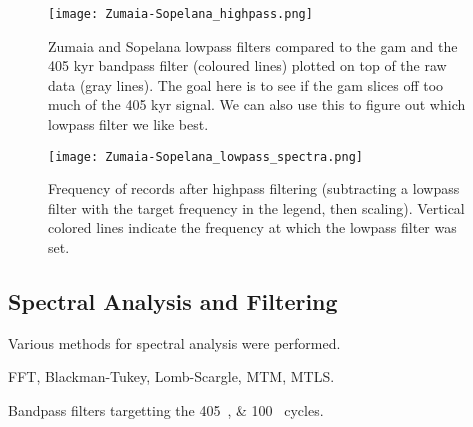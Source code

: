 \documentclass[draft]{agujournal2019}
\begin{document}
\begin{figure}[htbp]
  \centering
  \texttt{[image: Zumaia-Sopelana\_highpass.png]}
  \caption{\label{fig:highpass}Zumaia and Sopelana lowpass filters compared to
    the gam and the 405 kyr bandpass filter (coloured lines) plotted on top of
    the raw data (gray lines). The goal here is to see if the gam slices off
    too much of the 405 kyr signal. We can also use this to figure out which
    lowpass filter we like best.
  }
\end{figure}

\begin{figure}[htbp]
  \centering
  \texttt{[image: Zumaia-Sopelana\_lowpass\_spectra.png]}
  \caption{\label{fig:highpass-spec}Frequency of records after highpass
    filtering (subtracting a lowpass filter with the target frequency in the
    legend, then scaling). Vertical colored lines indicate the frequency at
    which the lowpass filter was set. }
\end{figure}





\subsection{Spectral Analysis and Filtering}\label{sec:spectral}
Various methods for spectral analysis were performed.

FFT, Blackman-Tukey, Lomb-Scargle, MTM, MTLS.

Bandpass filters targetting the \qtylist{405;100}{\kiloyear} cycles.
\end{document}
